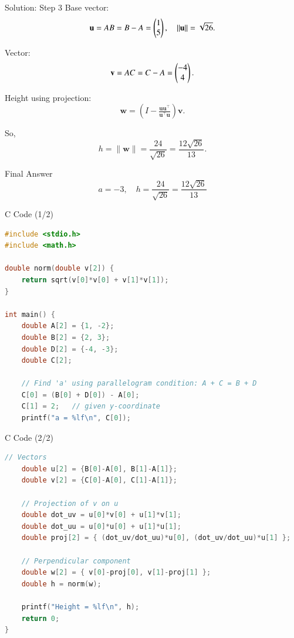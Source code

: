 \documentclass{beamer}
\begin{document}
\begin{frame}{Solution: Step 3}
Base vector:
\begin{equation}
\mathbf{u}=AB=B-A=\begin{pmatrix}1\\5\end{pmatrix}, \quad \|\mathbf{u}\|=\sqrt{26}.
\end{equation}

Vector:
\begin{equation}
\mathbf{v}=AC=C-A=\begin{pmatrix}-4\\4\end{pmatrix}.
\end{equation}

Height using projection:
\begin{equation}
\mathbf{w}=(I-\tfrac{\mathbf{u}\mathbf{u}^\top}{\mathbf{u}^\top\mathbf{u}})\mathbf{v}.
\end{equation}

So,
\begin{equation}
h=\|\mathbf{w}\|=\frac{24}{\sqrt{26}}=\frac{12\sqrt{26}}{13}.
\end{equation}
\end{frame}

\begin{frame}{Final Answer}
\[
\boxed{a=-3},\quad \boxed{h=\dfrac{24}{\sqrt{26}}=\dfrac{12\sqrt{26}}{13}}
\]
\end{frame}

\begin{frame}[fragile]{C Code (1/2)}
\begin{lstlisting}[language=C]
#include <stdio.h>
#include <math.h>

double norm(double v[2]) {
    return sqrt(v[0]*v[0] + v[1]*v[1]);
}

int main() {
    double A[2] = {1, -2};
    double B[2] = {2, 3};
    double D[2] = {-4, -3};
    double C[2];
    
    // Find 'a' using parallelogram condition: A + C = B + D
    C[0] = (B[0] + D[0]) - A[0];
    C[1] = 2;   // given y-coordinate
    printf("a = %lf\n", C[0]);
\end{lstlisting}
\end{frame}

\begin{frame}[fragile]{C Code (2/2)}
\begin{lstlisting}[language=C]
    // Vectors
    double u[2] = {B[0]-A[0], B[1]-A[1]};
    double v[2] = {C[0]-A[0], C[1]-A[1]};
    
    // Projection of v on u
    double dot_uv = u[0]*v[0] + u[1]*v[1];
    double dot_uu = u[0]*u[0] + u[1]*u[1];
    double proj[2] = { (dot_uv/dot_uu)*u[0], (dot_uv/dot_uu)*u[1] };
    
    // Perpendicular component
    double w[2] = { v[0]-proj[0], v[1]-proj[1] };
    double h = norm(w);
    
    printf("Height = %lf\n", h);
    return 0;
}
\end{lstlisting}
\end{frame}
\end{document}
